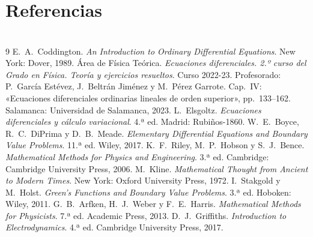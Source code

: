 \documentclass[11pt,twoside]{article}
\begin{document}
\section{Referencias}\label{sec:referencias}
{\small\renewcommand\section[2]{}
\begin{thebibliography}{9}
 E.~A.~Coddington. \emph{An Introduction to Ordinary Differential Equations}. New York: Dover, 1989.
 Área de Física Teórica. \emph{Ecuaciones diferenciales. 2.º curso del Grado en Física. Teoría y ejercicios
resueltos}. Curso 2022-23. Profesorado: P.~García Estévez, J.~Beltrán Jiménez y M.~Pérez Garrote. Cap.~IV: «Ecuaciones
diferenciales ordinarias lineales de orden superior», pp.~133--162. Salamanca: Universidad de Salamanca, 2023.
 L.~Elsgoltz. \emph{Ecuaciones diferenciales y cálculo variacional}. 4.ª ed. Madrid: Rubiños-1860.
 W.~E.~Boyce, R.~C.~DiPrima y D.~B.~Meade. \emph{Elementary Differential Equations and Boundary Value
Problems}. 11.ª ed. Wiley, 2017.
 K.~F.~Riley, M.~P.~Hobson y S.~J.~Bence. \emph{Mathematical Methods for Physics and Engineering}. 3.ª ed.
Cambridge: Cambridge University Press, 2006.
 M.~Kline. \emph{Mathematical Thought from Ancient to Modern Times}. New York: Oxford University Press, 1972.
 I.~Stakgold y M.~Holst. \emph{Green's Functions and Boundary Value Problems}. 3.ª ed. Hoboken: Wiley, 2011.
 G.~B.~Arfken, H.~J.~Weber y F.~E.~Harris. \emph{Mathematical Methods for Physicists}. 7.ª ed. Academic
Press, 2013.
 D.~J.~Griffiths. \emph{Introduction to Electrodynamics}. 4.ª ed. Cambridge University Press, 2017.
\end{thebibliography}}
\end{document}

